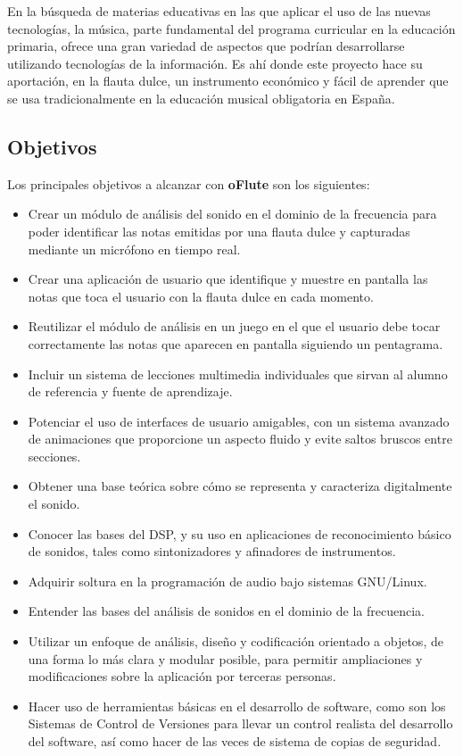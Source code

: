 \documentclass[a4paper,11pt]{article}
\begin{document}
En la búsqueda de materias educativas en las que aplicar el uso de las nuevas
tecnologías, la música, parte fundamental del programa curricular en la
educación primaria, ofrece una gran variedad de aspectos que podrían
desarrollarse utilizando tecnologías de la información. Es ahí donde este
proyecto hace su aportación, en la flauta dulce, un instrumento económico y
fácil de aprender que se usa tradicionalmente en la educación musical
obligatoria en España.

\subsection{Objetivos}
Los principales objetivos a alcanzar con \textbf{oFlute} son los siguientes:

\begin{itemize}
\item Crear un módulo de análisis del sonido en el dominio de la frecuencia para
  poder identificar las notas emitidas por una flauta dulce y capturadas
  mediante un micrófono en tiempo real.
\item Crear una aplicación de usuario que identifique y muestre en pantalla las
  notas que toca el usuario con la flauta dulce en cada momento.
\item Reutilizar el módulo de análisis en un juego en el que el
  usuario debe tocar correctamente las notas que aparecen en pantalla
  siguiendo un pentagrama.
\item Incluir un sistema de lecciones multimedia individuales que
  sirvan al alumno de referencia y fuente de aprendizaje.
\item Potenciar el uso de interfaces de usuario amigables, con un
  sistema avanzado de animaciones que proporcione un aspecto fluido y
  evite saltos bruscos entre secciones.
\item Obtener una base teórica sobre cómo se representa y caracteriza
  digitalmente el sonido.
\item Conocer las bases del DSP, y su uso en aplicaciones de
  reconocimiento básico de sonidos, tales como sintonizadores y
  afinadores de instrumentos.
\item Adquirir soltura en la programación de audio bajo sistemas GNU/Linux.
\item Entender las bases del análisis de sonidos en el dominio de la
  frecuencia. 
\item Utilizar un enfoque de análisis, diseño y codificación orientado
  a objetos, de una forma lo más clara y modular posible, para
  permitir ampliaciones y modificaciones sobre la aplicación por
  terceras personas.
\item Hacer uso de herramientas básicas en el desarrollo de software,
  como son los Sistemas de Control de Versiones para llevar
  un control realista del desarrollo del software, así como hacer de
  las veces de sistema de copias de seguridad.

\end{itemize}
\end{document}
